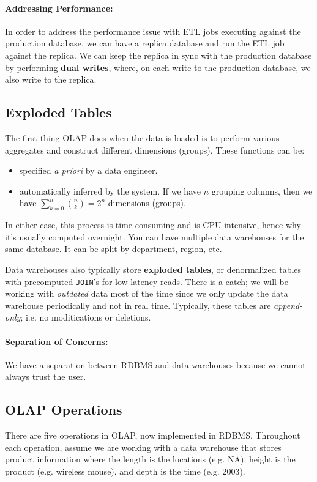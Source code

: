 \documentclass{report}
\renewcommand{\bf}[1]{\textbf{{#1}}}
\renewcommand{\tt}[1]{\texttt{{#1}}}
\renewcommand{\it}[1]{\textit{{#1}}}
\begin{document}
\paragraph{Addressing Performance:} In order to address the performance issue
with ETL jobs executing against the production database, we can have a replica
database and run the ETL job against the replica. We can keep the replica in
sync with the production database by performing \bf{dual writes}, where, on each
write to the production database, we also write to the replica.

\subsection{Exploded Tables}
The first thing OLAP does when the data is loaded is to perform various
aggregates and construct different dimensions (groups). These functions can be:
\begin{itemize}[label=$\to$]
    \item specified \it{a priori} by a data engineer.
    \item automatically inferred by the system. If we have $n$ grouping columns,
        then we have $\sum\limits_{k = 0}^{n} \binom{n}{k} = 2^n$ dimensions
        (groups).
\end{itemize}

In either case, this process is time consuming and is CPU intensive, hence why
it's usually computed overnight. You can have multiple data warehouses for the
same database. It can be split by department, region, etc.

Data warehouses also typically store \bf{exploded tables}, or denormalized
tables with precomputed \tt{JOIN}'s for low latency reads. There is a catch;
we will be working with \it{outdated} data most of the time since we only update
the data warehouse periodically and not in real time. Typically, these tables
are \it{append-only}; i.e. no moditications or deletions.

\paragraph{Separation of Concerns:} We have a separation between RDBMS and data
warehouses because we cannot always trust the user.

\subsection{OLAP Operations}
There are five operations in OLAP, now implemented in RDBMS. Throughout each
operation, assume we are working with a data warehouse that stores product
information where the length is the locations (e.g. NA), height is the product
(e.g. wireless mouse), and depth is the time (e.g. 2003).
\end{document}
